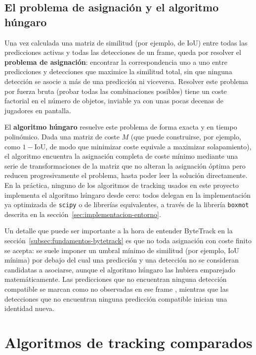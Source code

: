 \subsection{El problema de asignación y el algoritmo húngaro}
\label{subsec:fundamentos-hungaro}

Una vez calculada una matriz de similitud (por ejemplo, de IoU) entre todas
las predicciones activas y todas las detecciones de un frame, queda por
resolver el \textbf{problema de asignación}: encontrar la correspondencia
uno a uno entre predicciones y detecciones que maximice la similitud total,
sin que ninguna detección se asocie a más de una predicción ni viceversa.
Resolver este problema por fuerza bruta (probar todas las combinaciones
posibles) tiene un coste factorial en el número de objetos, inviable ya
con unas pocas decenas de jugadores en pantalla.

El \textbf{algoritmo húngaro} \citep{wikipedia2026hungaro} resuelve este
problema de forma exacta y en tiempo polinómico. Dada una matriz de coste
$M$ (que puede construirse, por ejemplo, como $1 - \mathrm{IoU}$, de modo
que minimizar coste equivale a maximizar solapamiento), el algoritmo
encuentra la asignación completa de coste mínimo mediante una serie de
transformaciones de la matriz que no alteran la asignación óptima pero
reducen progresivamente el problema, hasta poder leer la solución
directamente. En la práctica, ninguno de los algoritmos de tracking usados
en este proyecto implementa el algoritmo húngaro desde cero: todos delegan
en la implementación ya optimizada de \texttt{scipy} o de librerías
equivalentes, a través de la librería \texttt{boxmot} descrita en la
sección~\ref{sec:implementacion-entorno}.

Un detalle que puede ser importante a la hora de entender ByteTrack en la
sección~\ref{subsec:fundamentos-bytetrack} es que no toda asignación con
coste finito se acepta: se suele imponer un umbral mínimo de similitud
(por ejemplo, IoU mínima) por debajo del cual una predicción y una detección no
se consideran candidatas a asociarse, aunque el algoritmo húngaro las
hubiera emparejado matemáticamente. Las predicciones que no encuentran
ninguna detección compatible se marcan como no observadas en ese frame
, mientras que las
detecciones que no encuentran ninguna predicción compatible inician una
identidad nueva.

\section{Algoritmos de tracking comparados}
\label{sec:fundamentos-algoritmos}

